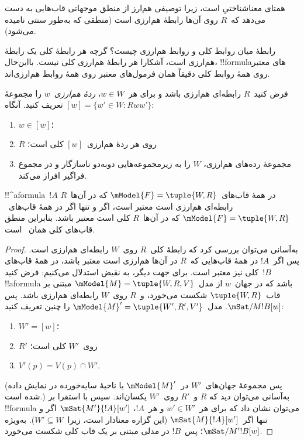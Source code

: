 \documentclass[../../../include/open-logic-section]{subfiles}
\begin{document}
 همتای معناشناختیِ
 است، زیرا توصیفی هم‌ارز از منطق موجهاتی قاب‌هایی
به دست می‌دهد که~$R$ روی آن‌ها رابطهٔ هم‌ارزی است (منطقی که به‌طور سنتی
 نامیده می‌شود).

رابطهٔ میان روابط کلی و روابط هم‌ارزی چیست؟ گرچه هر رابطهٔ کلی یک
رابطهٔ هم‌ارزی است، آشکارا هر رابطهٔ هم‌ارزی کلی نیست. بااین‌حال،
!!{formula}های معتبر روی همهٔ روابط کلی دقیقاً همان فرمول‌های معتبر
روی همهٔ روابط هم‌ارزی‌اند.

\begin{prop}
  فرض کنید~$R$ رابطه‌ای هم‌ارزی باشد و برای هر~$w \in W$،
  \emph{ردهٔ هم‌ارزی}~$w$ را مجموعهٔ
  $[w] = \{w'\in W : Rww'\}$ تعریف کنید. آنگاه:
  \begin{enumerate}
  \item $w \in [w]$؛
  \item $R$ روی هر ردهٔ هم‌ارزی~$[w]$ کلی است؛
  \item مجموعهٔ رده‌های هم‌ارزی، $W$ را به زیرمجموعه‌هایی دوبه‌دو
    ناسازگار و در مجموع فراگیر افراز می‌کند.
  \end{enumerate}
\end{prop}

\begin{prop}
  !!^a{formula}~$!A$ در همهٔ قاب‌های~$\mModel{F} =\tuple{W,R}$ که در
  آن‌ها~$R$ رابطه‌ای هم‌ارزی است معتبر است، اگر و تنها اگر در همهٔ
  قاب‌های~$\mModel{F} =\tuple{W,R}$ که در آن‌ها~$R$ کلی است معتبر باشد.
  بنابراین منطق قاب‌های کلی همان~ است.
\end{prop}

\begin{proof}
  به‌آسانی می‌توان بررسی کرد که رابطهٔ کلی~$R$ روی~$W$ رابطه‌ای هم‌ارزی
  است. پس اگر~$!A$ در همهٔ قاب‌هایی که~$R$ در آن‌ها هم‌ارزی است معتبر
  باشد، در همهٔ قاب‌های کلی نیز معتبر است. برای جهت دیگر، به نقیض
  استدلال می‌کنیم: فرض کنید~$!B$ !!a{formula} باشد که در جهان~$w$ از
  مدل~$\mModel{M} = \tuple{W, R,V}$ مبتنی بر قاب~$\tuple{W,R}$ شکست
  می‌خورد، و~$R$ روی~$W$ رابطه‌ای هم‌ارزی باشد. پس
  $\mSat/{M}{!B}[w]$. مدل~$\mModel{M}' = \tuple{W',R',V'}$ را چنین
  تعریف کنید:
  \begin{enumerate}
  \item $W' = [w]$؛
  \item $R'$ روی~$W'$ کلی است؛
  \item $V'(p) = V(p) \cap W'$.
  \end{enumerate}
  (پس مجموعهٔ جهان‌های~$W'$ در~$\mModel{M}'$ با ناحیهٔ سایه‌خورده در
   نمایش داده شده است.) به‌آسانی می‌توان دید که
  $R$ و~$R'$ روی~$W'$ یکسان‌اند. سپس با استقرا بر !!{formula} می‌توان
  نشان داد که برای هر~$w' \in W'$ و هر~$!A$،
  $\mSat{M'}{!A}[w']$ اگر و تنها اگر~$\mSat{M}{!A}[w']$ (این گزاره
  معنادار است، زیرا~$W' \subseteq W$). به‌ویژه
  $\mSat/{M'}{!B}[w]$؛ پس~$!B$ در مدلی مبتنی بر یک قاب کلی شکست
  می‌خورد.
\end{proof}
\end{document}
